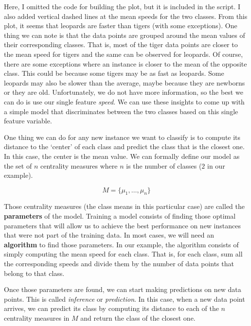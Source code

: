\documentclass[
  11pt,
]{krantz}
\begin{document}
Here, I omitted the code for building the plot, but it is included in the script. I also added vertical dashed lines at the mean speeds for the two classes. From this plot, it seems that leopards are faster than tigers (with some exceptions). One thing we can note is that the data points are grouped around the mean values of their corresponding classes. That is, most of the tiger data points are closer to the mean speed for tigers and the same can be observed for leopards. Of course, there are some exceptions where an instance is closer to the mean of the opposite class. This could be because some tigers may be as fast as leopards. Some leopards may also be slower than the average, maybe because they are newborns or they are old. Unfortunately, we do not have more information, so the best we can do is use our single feature \emph{speed}. We can use these insights to come up with a simple model that discriminates between the two classes based on this single feature variable.

One thing we can do for any new instance we want to classify is to compute its distance to the `center' of each class and predict the class that is the closest one. In this case, the center is the mean value. We can formally define our model as the set of \(n\) centrality measures where \(n\) is the number of classes (\(2\) in our example).

\begin{equation}
  M = \{\mu_1,\dots ,\mu_n\}
  \label{eq:simpleModel}
\end{equation}

Those centrality measures (the class means in this particular case) are called the \textbf{parameters} of the model. Training a model consists of finding those optimal parameters that will allow us to achieve the best performance on new instances that were not part of the training data. In most cases, we will need an \textbf{algorithm} to find those parameters. In our example, the algorithm consists of simply computing the mean speed for each class. That is, for each class, sum all the corresponding speeds and divide them by the number of data points that belong to that class.

Once those parameters are found, we can start making predictions on new data points. This is called \emph{inference} or \emph{prediction}. In this case, when a new data point arrives, we can predict its class by computing its distance to each of the \(n\) centrality measures in \(M\) and return the class of the closest one.
\end{document}
